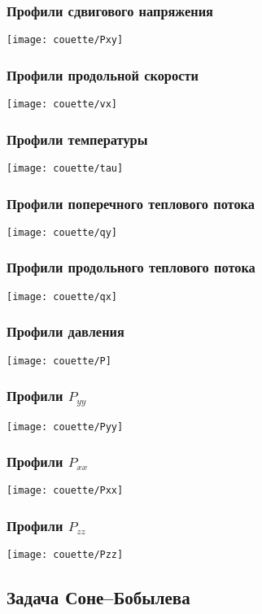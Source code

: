 \documentclass[mathserif]{beamer} %
\begin{document}
\begin{frame}
    \frametitle{Профили сдвигового напряжения}
    \centering
    \texttt{[image: couette/Pxy]}
\end{frame}

\begin{frame}
    \frametitle{Профили продольной скорости}
    \centering
    \texttt{[image: couette/vx]}
\end{frame}

\begin{frame}
    \frametitle{Профили температуры}
    \centering
    \texttt{[image: couette/tau]}
\end{frame}

\begin{frame}
    \frametitle{Профили поперечного теплового потока}
    \centering
    \texttt{[image: couette/qy]}
\end{frame}

\begin{frame}
    \frametitle{Профили продольного теплового потока}
    \centering
    \texttt{[image: couette/qx]}
\end{frame}

\begin{frame}
    \frametitle{Профили давления}
    \centering
    \texttt{[image: couette/P]}
\end{frame}

\begin{frame}
    \frametitle{Профили \(P_{yy}\)}
    \centering
    \texttt{[image: couette/Pyy]}
\end{frame}

\begin{frame}
    \frametitle{Профили \(P_{xx}\)}
    \centering
    \texttt{[image: couette/Pxx]}
\end{frame}

\begin{frame}
    \frametitle{Профили \(P_{zz}\)}
    \centering
    \texttt{[image: couette/Pzz]}
\end{frame}

\subsection{Задача Соне--Бобылева}
\end{document}
